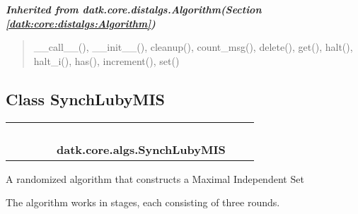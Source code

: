 \large{\textbf{\textit{Inherited from datk.core.distalgs.Algorithm\textit{(Section \ref{datk:core:distalgs:Algorithm})}}}}

\begin{quote}
\_\_call\_\_(), \_\_init\_\_(), cleanup(), count\_msg(), delete(), get(), halt(), halt\_i(), has(), increment(), set()
\end{quote}


\subsection{Class SynchLubyMIS}

    \label{datk:core:algs:SynchLubyMIS}
\begin{tabular}{cccccccc}
\multicolumn{2}{r}{\settowidth{\BCL}{datk.core.distalgs.Algorithm}\multirow{2}{\BCL}{datk.core.distalgs.Algorithm}}
&&
&&
  \\\cline{3-3}
  &&\multicolumn{1}{c|}{}
&&
&&
  \\
\multicolumn{4}{r}{\settowidth{\BCL}{datk.core.distalgs.Synchronous\_Algorithm}\multirow{2}{\BCL}{datk.core.distalgs.Synchronous\_Algorithm}}
&&
  \\\cline{5-5}
  &&&&\multicolumn{1}{c|}{}
&&
  \\
&&&&\multicolumn{2}{l}{\textbf{datk.core.algs.SynchLubyMIS}}
\end{tabular}

A randomized algorithm that constructs a Maximal Independent Set

The algorithm works in stages, each consisting of three rounds.

